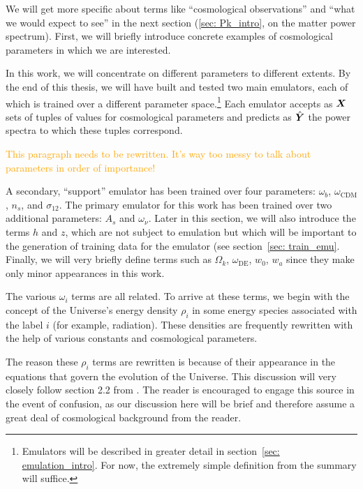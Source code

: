 We will get more specific about terms like ``cosmological observations''
and ``what we would expect to see'' in the next section (\ref{sec: Pk_intro}, 
on the matter power spectrum). First, we will briefly introduce concrete
examples of cosmological parameters in which we are interested.

In this work, we will concentrate on different parameters to different 
extents. By the end of this thesis, we will have built and tested two main
emulators, each of which is trained over a different parameter
space.\footnote{Emulators will be described in greater detail in
section~\ref{sec: emulation_intro}. For now, the extremely simple definition 
from the summary will suffice.}
Each emulator accepts as $\bm{X}$ sets of tuples of values for cosmological 
parameters and predicts as $\hat{\bm{Y}}$ the power spectra to which these
tuples correspond. 


\textcolor{orange}{This paragraph needs to be rewritten. It's way too messy
to talk about parameters in order of importance!}

A secondary, ``support'' emulator has been trained over four parameters:
$\omega_b$, $\omega_\text{CDM}$, $n_s$, and $\sigma_{12}$.
The primary emulator for this work has been trained over two additional
parameters: $A_s$ and $\omega_\nu$. Later in this section, we will also 
introduce the terms $h$ and $z$, which are not subject to emulation but which 
will be important to the generation of training data for the emulator (see 
section~\ref{sec: train_emu}. Finally, we will very briefly define terms such 
as $\Omega_k$, $\omega_\text{DE}$, $w_0$, $w_a$ since they make only minor 
appearances in this work.


The various $\omega_i$  terms are all related. To arrive at these
terms, we begin with the concept of the Universe's energy density $\rho_i$
in some energy species associated with the label $i$ (for example, radiation).
These densities are frequently rewritten with the help of various constants
and cosmological parameters.

The reason these $\rho_i$ terms are rewritten is because of their appearance
in the equations that govern the evolution of the Universe. This discussion
will very closely follow section 2.2 from . The reader is
encouraged to engage this source in the event of confusion, as our discussion 
here will be brief and therefore assume a great deal of cosmological 
background from the reader.

